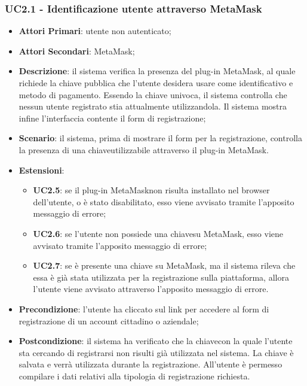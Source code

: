 \subsubsection{UC2.1 - Identificazione utente attraverso MetaMask\glo}
\begin{itemize}
	\item \textbf{Attori Primari}: utente non autenticato;
	\item \textbf{Attori Secondari}: MetaMask\glo;
	\item \textbf{Descrizione}: il sistema verifica la presenza del plug-in MetaMask\glo, al quale richiede la chiave pubblica che l'utente desidera usare come identificativo e metodo di pagamento. Essendo la chiave univoca, il sistema controlla che nessun utente registrato stia attualmente utilizzandola. Il sistema mostra infine l'interfaccia contente il form di registrazione;
	\item \textbf{Scenario}: il sistema, prima di mostrare il form per la registrazione, controlla la presenza di una chiave\glosp utilizzabile attraverso il plug-in MetaMask\glo.
	\item \textbf{Estensioni}:
		\begin{itemize}
		\item \textbf{UC2.5}: se il plug-in MetaMask\glosp non risulta installato nel browser dell'utente, o è stato disabilitato, esso viene avvisato tramite l'apposito messaggio di errore;
		\item \textbf{UC2.6}: se l'utente non possiede una chiave\glosp su MetaMask\glo, esso viene avvisato tramite l'apposito messaggio di errore;
		\item \textbf{UC2.7}: se è presente una chiave su MetaMask\glo, ma il sistema rileva che essa è già stata utilizzata per la registrazione sulla piattaforma, allora l'utente viene avvisato attraverso l'apposito messaggio di errore.
		\end{itemize}
	\item \textbf{Precondizione}: l'utente ha cliccato sul link per accedere al form di registrazione di un account cittadino o aziendale;
	\item \textbf{Postcondizione}: il sistema ha verificato che la chiave\glosp con la quale l'utente sta cercando di registrarsi non risulti già utilizzata nel sistema. La chiave è salvata e verrà utilizzata durante la registrazione. All'utente è permesso compilare i dati relativi alla tipologia di registrazione richiesta.
	
\end{itemize}
